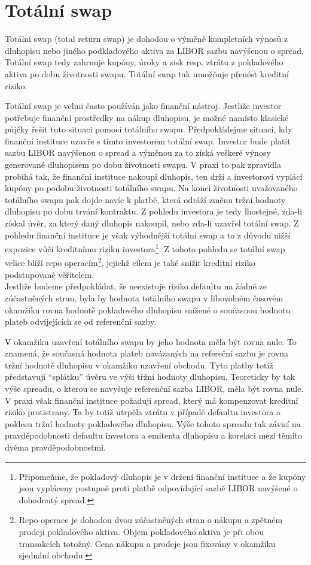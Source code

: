 \documentclass[a4paper]{book}
\begin{document}
\section{Totální swap}

Totální swap (total return swap) je dohodou o výměně kompletních výnosů z dluhopisu nebo jiného podkladového aktiva za LIBOR sazbu navýšenou o spread. Totální swap tedy zahrnuje kupóny, úroky a zisk resp. ztrátu z pokladového aktiva po dobu životnosti swapu. Totální swap tak umožňuje přenést kreditní riziko. 

Totální swap je velmi často používán jako finanční nástroj. Jestliže investor potřebuje finanční prostředky na nákup dluhopisu, je možné namísto klasické půjčky řešit tuto situaci pomocí totálního swapu. Předpokládejme situaci, kdy finanční instituce uzavře s tímto investorem totální swap. Investor bude platit sazbu LIBOR navýšenou o spread a výměnou za to získá veškeré výnosy generované dluhopisem po dobu životnosti swapu. V praxi to pak zpravidla probíhá tak, že finanční instituce nakoupí dluhopis, ten drží a investorovi vyplácí kupóny po podobu životnosti totálního swapu. Na konci životnosti uvažovaného totálního swapu pak dojde navíc k platbě, která odráží změnu tržní hodnoty dluhopisu po dobu trvání kontraktu. Z pohledu investora je tedy lhostejné, zda-li získal úvěr, za který daný dluhopis nakoupil, nebo zda-li uzavřel totální swap. Z pohledu finanční instituce je však výhodnější totální swap a to z důvodu nižší expozice vůči kreditnímu riziku investora\footnote{Připomeňme, že pokladový dluhopis je v držení finanční instituce a že kupóny jsou vypláceny postupně proti platbě odpovídající sazbě LIBOR navýšené o dohodnutý spread.}. Z tohoto pohledu se totální swap velice blíží repo operacím\footnote{Repo operace je dohodou dvou zúčastněných stran o nákupu a zpětném prodeji pokladového aktiva. Objem pokladového aktiva je při obou transakcích totožný. Cena nákupu a prodeje jsou fixovány v okamžiku sjednání obchodu.}, jejichž cílem je také snížit kreditní riziko podstupované věřitelem.\\

Jestliže budeme předpokládat, že neexistuje riziko defaultu na žádné ze zúčastněných stran, byla by hodnota totálního swapu v libovolném časovém okamžiku rovna hodnotě pokladového dluhopisu snížené o současnou hodnotu plateb odvíjejících se od referenční sazby.

V okamžiku uzavření totálního swapu by jeho hodnota měla být rovna nule. To znamená, že současná hodnota plateb navázaných na refereční sazbu je rovna  tržní hodnotě dluhopisu v okamžiku uzavření obchodu. Tyto platby totiž představují ``splátku'' úvěru ve výši třžní hodnoty dluhopisu. Teoreticky by tak výše spreadu, o kterou se navyšuje referenční sazba LIBOR, měla být rovna nule. V praxi však finanční instituce požadují spread, který má kompenzovat kreditní riziko protistrany. Ta by totiž utrpěla ztrátu v případě defaultu investora a poklesu tržní hodnoty pokladového dluhopisu. Výše tohoto spreadu tak závisí na pravděpodobnosti defaultu investora a emitenta dluhopisu a korelaci mezi těmito dvěma pravděpodobnostmi.
\end{document}
